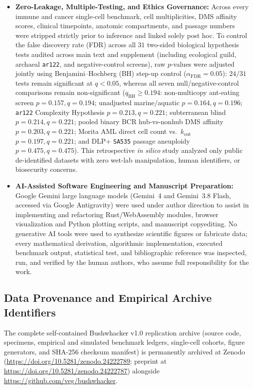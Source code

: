 \documentclass[12pt]{article}
\begin{document}
\begin{itemize}
    \item \textbf{Zero-Leakage, Multiple-Testing, and Ethics Governance:} Across every immune and cancer single-cell benchmark, cell multiplicities, DMS affinity scores, clinical timepoints, anatomic compartments, and passage numbers were stripped strictly prior to inference and linked solely post hoc. To control the false discovery rate (FDR) across all $31$ two-sided biological hypothesis tests audited across main text and supplement (including ecological guild, archaeal \texttt{ar122}, and negative-control screens), raw $p$-values were adjusted jointly using Benjamini--Hochberg (BH) step-up control ($\alpha_{\text{FDR}} = 0.05$): $24/31$ tests remain significant at $q < 0.05$, whereas all seven null/negative-control comparisons remain non-significant ($q_{\text{BH}} \ge 0.194$: non-multicopy ant-eating screen $p = 0.157, q = 0.194$; unadjusted marine/aquatic $p = 0.164, q = 0.196$; \texttt{ar122} Complexity Hypothesis $p = 0.213, q = 0.221$; subterranean blind $p = 0.214, q = 0.221$; pooled binary BCR hub-vs-nonhub DMS affinity $p = 0.203, q = 0.221$; Morita AML direct cell count vs.\ $k_{\text{out}}$ $p = 0.197, q = 0.221$; and DLP+ \texttt{SA535} passage aneuploidy $p = 0.475, q = 0.475$). This retrospective \textit{in silico} study analyzed only public de-identified datasets with zero wet-lab manipulation, human identifiers, or biosecurity concerns.
    \item \textbf{AI-Assisted Software Engineering and Manuscript Preparation:} Google Gemini large language models (Gemini~4 and Gemini~3.8 Flash, accessed via Google Antigravity) were used under author direction to assist in implementing and refactoring Rust/WebAssembly modules, browser visualization and Python plotting scripts, and manuscript copyediting. No generative AI tools were used to synthesize scientific figures or fabricate data; every mathematical derivation, algorithmic implementation, executed benchmark output, statistical test, and bibliographic reference was inspected, run, and verified by the human authors, who assume full responsibility for the work.
\end{itemize}

\subsection*{Data Provenance and Empirical Archive Identifiers}

The complete self-contained Bushwhacker v1.0 replication archive (source code, specimens, empirical and simulated benchmark ledgers, single-cell cohorts, figure generators, and SHA-256 checksum manifest) is permanently archived at Zenodo (\url{https://doi.org/10.5281/zenodo.24222789}; preprint at \url{https://doi.org/10.5281/zenodo.24222787}) alongside \url{https://github.com/veg/bushwhacker}.
\end{document}
